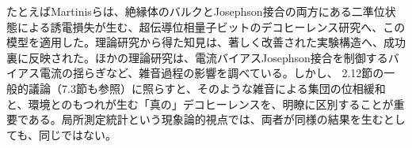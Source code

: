 たとえばMartinisら\cite{ref292}は、絶縁体のバルクとJosephson接合の両方にある二準位状態による誘電損失が生む、超伝導位相量子ビットのデコヒーレンス研究へ、この模型を適用した。理論研究から得た知見は、著しく改善された実験構造へ、成功裏に反映された。ほかの理論研究は、電流バイアスJosephson接合を制御するバイアス電流の揺らぎなど、雑音過程の影響を調べている\cite{ref293}。しかし、
\hypertarget{srcpage:282}{}\label{srcpage:282}
2.12節の一般的議論（7.3節も参照）に照らすと、そのような雑音による集団の位相緩和と、環境とのもつれが生む「真の」デコヒーレンスを、明瞭に区別することが重要である。局所測定統計という現象論的視点では、両者が同様の結果を生むとしても、同じではない。

